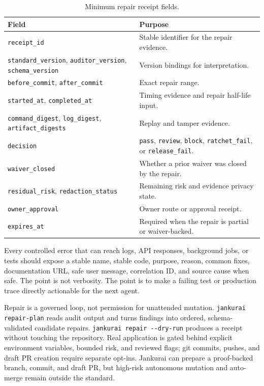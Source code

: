 \begin{table}[t]
\caption{Minimum repair receipt fields.}
\label{tab:repair-receipts}
\centering
\scriptsize
\begin{tabularx}{\textwidth}{L{0.24\textwidth} Y}
\toprule
\textbf{Field} & \textbf{Purpose} \\
\midrule
\texttt{receipt\_id} & Stable identifier for the repair evidence. \\
\texttt{standard\_version}, \texttt{auditor\_version}, \texttt{schema\_version} & Version bindings for interpretation. \\
\texttt{before\_commit}, \texttt{after\_commit} & Exact repair range. \\
\texttt{started\_at}, \texttt{completed\_at} & Timing evidence and repair half-life input. \\
\texttt{command\_digest}, \texttt{log\_digest}, \texttt{artifact\_digests} & Replay and tamper evidence. \\
\texttt{decision} & \texttt{pass}, \texttt{review}, \texttt{block}, \texttt{ratchet\_fail}, or \texttt{release\_fail}. \\
\texttt{waiver\_closed} & Whether a prior waiver was closed by the repair. \\
\texttt{residual\_risk}, \texttt{redaction\_status} & Remaining risk and evidence privacy state. \\
\texttt{owner\_approval} & Owner route or approval receipt. \\
\texttt{expires\_at} & Required when the repair is partial or waiver-backed. \\
\bottomrule
\end{tabularx}
\end{table}

Every controlled error that can reach logs, API responses, background jobs, or tests should expose a stable name, stable code, purpose, reason, common fixes, documentation URL, safe user message, correlation ID, and source cause when safe. The point is not verbosity. The point is to make a failing test or production trace directly actionable for the next agent.

Repair is a governed loop, not permission for unattended mutation. \texttt{jankurai repair-plan} reads audit output and turns findings into ordered, schema-validated candidate repairs. \verb|jankurai repair --dry-run| produces a receipt without touching the repository. Real application is gated behind explicit environment variables, bounded risk, and reviewed flags; git commits, pushes, and draft PR creation require separate opt-ins. Jankurai can prepare a proof-backed branch, commit, and draft PR, but high-risk autonomous mutation and auto-merge remain outside the standard.
